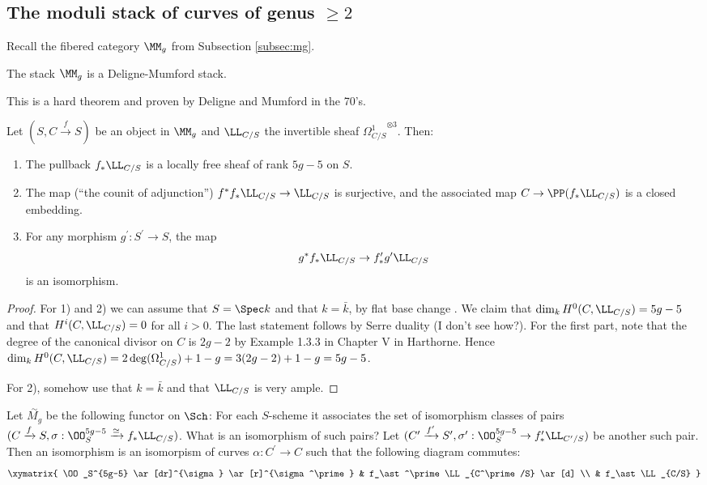\documentclass[11pt, english]{article}
\begin{document}
\subsection{The moduli stack of curves of genus $\geq 2$}
\label{subsec:mg2}

Recall the fibered category $\MM_g$ from Subsection \ref{subsec:mg}. 

\begin{thm}
The stack $\MM_g$ is a Deligne-Mumford stack.
\end{thm}
This is a hard theorem and proven by Deligne and Mumford in the 70's. 

\begin{lemma}
Let $(S, C \xrightarrow{f} S)$ be an object in $\MM_g$ and $\LL_{C/S}$ the invertible sheaf ${\Omega^1_{C/S}}^{\otimes 3}$. Then:
\begin{enumerate}
\item The pullback $f_\ast \LL_{C/S}$ is a locally free sheaf of rank $5g-5$ on $S$. 
\item The map (``the counit of adjunction'') $f^\ast f_\ast \LL_{C/S} \to \LL_{C/S}$ is surjective, and the associated map $C \to \PP(f_\ast \LL_{C/S})$ is a closed embedding. 
\item For any morphism $g^\prime: S^\prime \to S$, the map 
\[
g^\ast f_\ast \LL_{C/S} \to f_\ast^\prime g^\prime  \LL_{C/S} 
\]
is an isomorphism. 
\end{enumerate}
\end{lemma}
\begin{proof}
For 1) and 2) we can assume that $S=\Spec k$ and that $k= \bar k$, by flat base change \cite[Chapter III, §12, Thm 12.11]{hartshorne}. We claim that $\dim_k H^0(C, \LL_{C/S}) = 5g-5$ and that $H^i(C, \LL_{C/S}) = 0$ for all $i> 0$. The last statement follows by Serre duality (I don't see how?). For the first part, note that the degree of the canonical divisor on $C$ is $2g-2$ by Example 1.3.3 in Chapter V in Harthorne. Hence $\dim_k H^0(C, \LL_{C/S}) = 2 \deg(\Omega_{C/S}^1) + 1 -g = 3(2g-2)+1-g=5g-5$. 

For 2), somehow use that $k = \bar k$ and that $\LL_{C/S}$ is very ample.
\end{proof}

Let $\overset{\sim}{M_g}$ be the following functor on $\Sch$: For each $S$-scheme it associates the set of isomorphism classes of pairs $(C \xrightarrow{f} S, \sigma:\OO_S^{5g-5} \xrightarrow{\simeq} f_\ast \LL_{C/S})$. What is an isomorphism of such pairs? Let $(C^\prime \xrightarrow{f^\prime} S^\prime, \sigma^\prime:\OO_S^{5g-5} \to f_\ast^\prime \LL_{C^\prime/S})$ be another such pair. Then an isomorphism is an isomorpism of curves $\alpha:C^\prime \to C$ such that the following diagram commutes:
\[
\xymatrix{
\OO_S^{5g-5} \ar[dr]^{\sigma} \ar[r]^{\sigma^\prime} & f_\ast^\prime \LL_{C^\prime/S} \ar[d] \\
& f_\ast \LL_{C/S}
} 
\]
\end{document}
